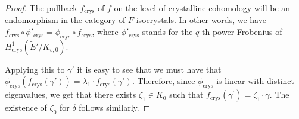 \documentclass[10pt,a4paper]{amsart}
\DeclareMathOperator{\crys}{crys}
\begin{document}
\begin{proof} The pullback $f_{\crys}$ of $f$ on the level of crystalline cohomology will be an endomorphism in the category of $F$-isocrystals. In other words, we have $f_{\crys}\circ\phi'_{\crys} =\phi_{\crys}\circ f_{\crys}$, where $\phi'_{\crys}$ stands for the $q$-th power Frobenius of $H^1_{\crys}(\tilde{E}'/K_{v,0})$.
	
	 Applying this to $\gamma'$ it is easy to see that we must have that $\phi_{\crys}( f_{\crys}(\gamma'))= \lambda_1\cdot f_{\crys}(\gamma')$. Therefore, since $\phi_{\crys}$ is linear with distinct eigenvalues, we get that there exists $\zeta_1\in K_0$ such that $f_{\crys}(\gamma^{\prime})=\zeta_1\cdot \gamma$. The existence of $\zeta_0$ for $\delta$ follows similarly.
\end{proof}
\end{document}
